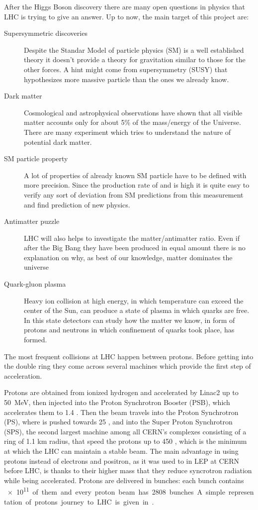 After the Higgs Boson discovery there are many open questions in physics that LHC is trying to give an answer. Up to now, the main target of this project are:
\begin{description}
\item[Supersymmetric discoveries] Despite the Standar Model of particle physics (SM) is a well established theory it doesn't provide a theory for gravitation similar to those for the other forces. A hint might come from supersymmetry (SUSY) that hypothesizes more massive particle than the ones we already know.
\item[Dark matter] Cosmological and astrophysical observations have shown that all visible matter accounts only for about 5\% of the mass/energy of the Universe. There are many experiment which tries to understand the nature of potential dark matter.
\item[SM particle property] A lot of properties of already known SM particle have to be defined with more precision. Since the production rate of \Wboson and \Zboson is high it is quite easy to verify any sort of deviation from SM predictions from this measurement and find prediction of new physics.
\item[Antimatter puzzle] LHC will also helps to investigate the matter/antimatter ratio. Even if after the Big Bang they have been produced in equal amount there is no explanation on why, as best of our knowledge, matter dominates the universe
\item[Quark-gluon plasma] Heavy ion collision at high energy, in which temperature can exceed the center of the Sun, can produce a state of plasma in which quarks are free. In this state detectors can study how the matter we know, in form of protons and neutrons in which confinement of quarks took place, has formed.
\end{description}

The most frequent collisions at LHC happen between protons. Before getting into the double ring they come across several machines which provide the first step of acceleration.

Protons are obtained from ionized hydrogen and accelerated by Linac2 up to \SI{50}{MeV}, then injected into the Proton Synchrotron Booster (PSB), which accelerates them to 1.4 \GeV. Then the beam travels into the Proton Synchrotron (PS), where is pushed towards 25 \GeV, and into the Super Proton Synchrotron (SPS),  the second largest machine among all CERN's complexes consisting of a ring of 1.1 km radius, that speed the protons up to 450 \GeV, which is the minimum at which the LHC can maintain a stable beam. The main advantage in using protons instead of electrons and positron, as it was used to in LEP at CERN before LHC, is thanks to their higher mass that they reduce syncrotron radiation while being accelerated. Protons are delivered in bunches: each bunch contains \SI{e11} of them and every proton beam has 2808 bunches. A simple representation of protons journey to LHC is given in \Fig{\ref{fig:accelerators}}.

